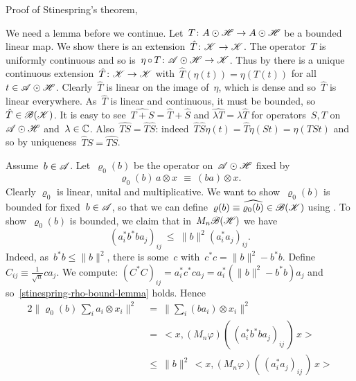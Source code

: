\begin{parsec}
\begin{point}
\begin{point}{%
    Proof of Stinespring's theorem, }
\begin{point}
We need a lemma before we continue.
Let~$T\colon A \odot \mathscr{H} \to A \odot \mathscr{H}$
be a bounded linear map.
We show there is an extension~$\hat{T} \colon \mathscr{K} \to \mathscr{K}$.
The operator~$T$ is
uniformly continuous and so is~$\eta\mathop{\circ} T \colon \mathscr{A}\odot\mathscr{H} \to\mathscr{K}$.
Thus by 
there is a unique continuous extension~$\hat{T} \colon \mathscr{K} \to \mathscr{K}$
with~$\hat{T}(\eta(t)) = \eta(T(t))$
    for all~$t \in \mathscr{A}\odot\mathscr{H}$.
Clearly~$\hat{T}$ is linear on the image of~$\eta$,
    which is dense and so~$\hat{T}$ is linear everywhere.
As~$\hat{T}$ is linear and continuous, it must be
    bounded, so~$\hat{T} \in \mathscr{B}(\mathscr{K})$.
It is easy to see~$\widehat{T+S}=\hat{T}+\hat{S}$ and
    $\widehat{\lambda T} = \lambda \hat{T}$
    for operators~$S,T$ on~$\mathscr{A} \odot \mathscr{H}$ and~$\lambda \in \mathbb{C}$.
Also~$\widehat{TS} = \hat{T}\hat{S}$:
indeed~$\hat{T}\hat{S} \eta(t)
            = \hat{T} \eta(St)
            = \eta(TSt)$
    and so by uniqueness~$\hat{T}\hat{S} = \widehat{TS}$.
\end{point}
\begin{point}%
    Assume~$b\in \mathscr{A}$.
    Let~$\varrho_0(b)$ be the operator on~$\mathscr{A} \odot \mathscr{H}$
    fixed by
\begin{equation*}
    \varrho_0(b)\, a\otimes x\, \  \equiv\  (b a) \otimes x.
\end{equation*}
Clearly $\varrho_0$ is linear, unital and multiplicative.
We want to show~$\varrho_0(b)$ is bounded for fixed~$b \in \mathscr{A}$,
    so that we can define~$\varrho(b) \equiv \widehat{\varrho_0(b)}
            \in \mathscr{B}(\mathscr{K})$ using .
    To show~$\varrho_0(b)$ is bounded, we claim that in~$M_n\mathscr{B}(\mathscr{H})$
we have
\begin{equation}\label{stinespring-rho-bound-lemma}
(a_i^*b^*ba_j)_{ij} \ \leq\  \|b\|^2 (a_i^*a_j)_{ij}.
\end{equation}
Indeed, as~$b^*b \leq \|b\|^2$,
    there is some~$c$ with~$c^*c = \|b\|^2 - b^*b$.
Define~$C_{ij} \equiv \frac{1}{\sqrt{n}} ca_j$.
We compute:
$ (C^*C)_{ij} = a_i^*c^*ca_j = a_i^* (\|b\|^2 - b^*b) a_j$
and so~\eqref{stinespring-rho-bound-lemma} holds.
Hence
\begin{alignat*}{2}
    \bigl\| \varrho_0(b) \,\sum_i a_i \otimes x_i \bigr\|^2
    & \ = \ \bigl\| \sum_i (ba_i) \otimes x_i \bigr\|^2 \\
    & \ =\  \bigl< x, (M_n\varphi)(\, (a_i^* b^*b a_j)_{ij}\,)\,x\bigr> \\
    &\ \leq\  \|b\|^2 \, \bigl< x, (M_n\varphi)(\, (a_i^* a_j)_{ij}\,) \, x\bigr>

\end{alignat*}
\end{point}
\end{point}
\end{point}
\end{parsec}
